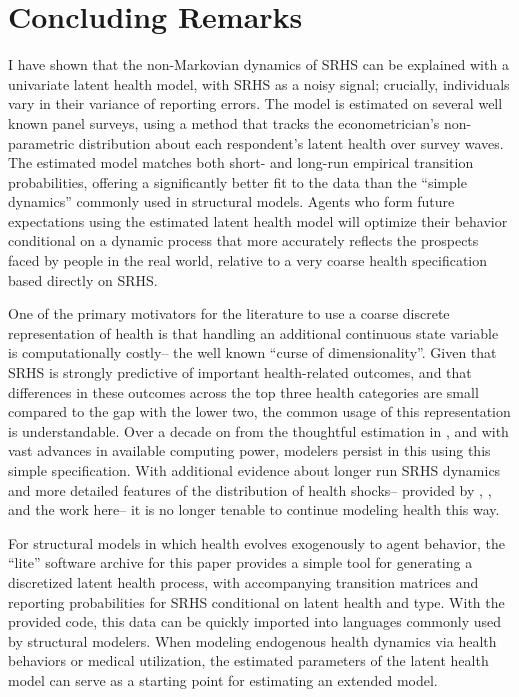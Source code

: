 \documentclass[12pt,pdftex,letterpaper]{article}
\begin{document}
\section{Concluding Remarks}\label{sec:Conclusion}

I have shown that the non-Markovian dynamics of SRHS can be explained with a univariate latent health model, with SRHS as a noisy signal; crucially, individuals vary in their variance of reporting errors.  The model is estimated on several well known panel surveys, using a method that tracks the econometrician's non-parametric distribution about each respondent's latent health over survey waves.  The estimated model matches both short- and long-run empirical transition probabilities, offering a significantly better fit to the data than the ``simple dynamics'' commonly used in structural models. Agents who form future expectations using the estimated latent health model will optimize their behavior conditional on a dynamic process that more accurately reflects the prospects faced by people in the real world, relative to a very coarse health specification based directly on SRHS.

One of the primary motivators for the literature to use a coarse discrete representation of health is that handling an additional continuous state variable is computationally costly-- the well known ``curse of dimensionality''. Given that SRHS is strongly predictive of important health-related outcomes, and that differences in these outcomes across the top three health categories are small compared to the gap with the lower two, the common usage of this representation is understandable. Over a decade on from the thoughtful estimation in \cite{BoundStinebrickner10}, and with vast advances in available computing power, modelers persist in this using this simple specification. With additional evidence about longer run SRHS dynamics and more detailed features of the distribution of health shocks-- provided by \cite{DeNardi18}, \cite{HosseiniZhao21a}, and the work here-- it is no longer tenable to continue modeling health this way.

For structural models in which health evolves exogenously to agent behavior, the ``lite'' software archive for this paper provides a simple tool for generating a discretized latent health process, with accompanying transition matrices and reporting probabilities for SRHS conditional on latent health and type. With the provided code, this data can be quickly imported into languages commonly used by structural modelers. When modeling endogenous health dynamics via health behaviors or medical utilization, the estimated parameters of the latent health model can serve as a starting point for estimating an extended model.




\end{document}
